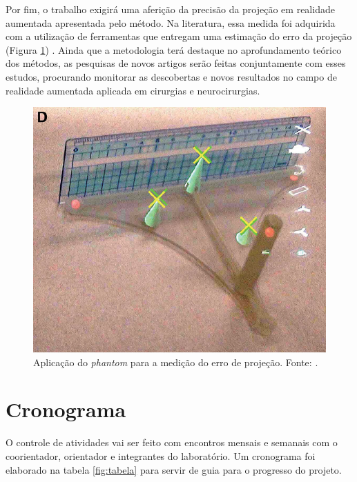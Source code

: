 Por fim, o trabalho exigirá uma aferição da precisão da projeção em realidade aumentada apresentada pelo método. Na literatura, essa medida foi adquirida com a utilização de ferramentas que entregam uma estimação do erro da projeção (Figura \ref{fig:phantom}) \cite{Maruyama2018}. Ainda que a metodologia terá destaque no aprofundamento teórico dos métodos, as pesquisas de novos artigos serão feitas conjuntamente com esses estudos, procurando monitorar as descobertas e novos resultados no campo de realidade aumentada aplicada em cirurgias e neurocirurgias.

\begin{figure}[ht]
   \centering
   \includegraphics[width=.5\linewidth]{figuras/phatom.png}
   \caption{Aplicação do \textit{phantom} para a medição do erro de projeção. Fonte: \cite{Maruyama2018}.}
   \label{fig:phantom}
\end{figure}



\newpage

\section{Cronograma}

O controle de atividades vai ser feito com encontros mensais e semanais com o coorientador, orientador e integrantes do laboratório. Um cronograma foi elaborado na tabela \ref{fig:tabela} para servir de guia para o progresso do projeto.

